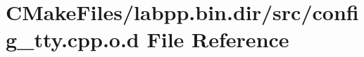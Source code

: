 \hypertarget{CMakeFiles_2labpp_8bin_8dir_2src_2config__tty_8cpp_8o_8d}{}\section{C\+Make\+Files/labpp.bin.\+dir/src/config\+\_\+tty.cpp.\+o.\+d File Reference}
\label{CMakeFiles_2labpp_8bin_8dir_2src_2config__tty_8cpp_8o_8d}
